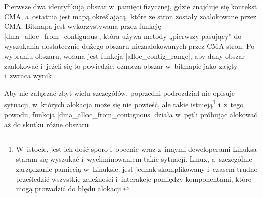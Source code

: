 Pierwsze dwa identyfikują obszar w~pamięci fizycznej, gdzie znajduje
się kontekst CMA, a~ostatnia jest mapą określającą, które ze stron
zostały zaalokowane przez CMA.  Bitmapa jest wykorzystywana przez
funkcję \code|dma_alloc_from_contiguous|, która używa metody „pierwszy
pasujący” do wyszukania dostatecznie dużego obszaru niezaalokowanych
przez CMA stron.  Po wybraniu obszaru, wołana jest funkcja
\code|alloc_contig_range|, aby dany obszar zaalokować i~jeżeli się to
powiedzie, oznacza obszar w~bitmapie jako zajęty i~zwraca wynik.

Aby nie załączać zbyt wielu szczegółów, poprzedni podrozdział nie
opisuje sytuacji, w~których alokacja może się nie powieść, ale takie
istnieją\footnote{W~istocie, jest ich dość sporo i~obecnie wraz
  z~innymi deweloperami Linuksa staram się wyszukać i~wyeliminowaniem
  takie sytuacji.  Linux, a~szczególnie zarządzanie pamięcią
  w~Linuksie, jest jednak skomplikowany i~czasem trudno prześledzić
  wszystkie zależności i~interakcje pomiędzy komponentami, które mogą
  prowadzić do błędu alokacji.} i~z~tego powodu, funkcja
\code|dma_alloc_from_contiguous| działa w~pętli próbując alokować aż
do skutku różne obszaru.
